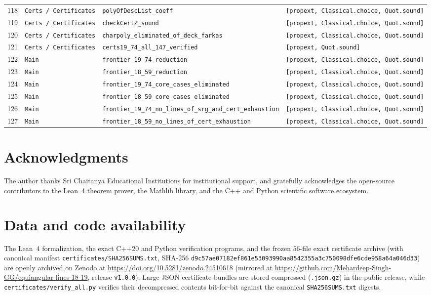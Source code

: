 \documentclass[11pt,reqno]{amsart}
\theoremstyle{definition}
\theoremstyle{remark}
\numberwithin{equation}{section}
\numberwithin{table}{section}
\begin{document}
{\begin{longtable}{@{}r>{\raggedright\arraybackslash}p{1.2in}>{\raggedright\arraybackslash}p{2.55in}>{\raggedright\arraybackslash}p{1.85in}@{}}
118 & \nolinkurl{Certs / Certificates} & \nolinkurl{polyOfDescList_coeff} & \texttt{[propext, Classical.choice, Quot.sound]} \\
119 & \nolinkurl{Certs / Certificates} & \nolinkurl{checkCertZ_sound} & \texttt{[propext, Classical.choice, Quot.sound]} \\
120 & \nolinkurl{Certs / Certificates} & \nolinkurl{charpoly_eliminated_of_deck_farkas} & \texttt{[propext, Classical.choice, Quot.sound]} \\
121 & \nolinkurl{Certs / Certificates} & \nolinkurl{certs19_74_all_147_verified} & \texttt{[propext, Quot.sound]} \\
122 & \nolinkurl{Main} & \nolinkurl{frontier_19_74_reduction} & \texttt{[propext, Classical.choice, Quot.sound]} \\
123 & \nolinkurl{Main} & \nolinkurl{frontier_18_59_reduction} & \texttt{[propext, Classical.choice, Quot.sound]} \\
124 & \nolinkurl{Main} & \nolinkurl{frontier_19_74_core_cases_eliminated} & \texttt{[propext, Classical.choice, Quot.sound]} \\
125 & \nolinkurl{Main} & \nolinkurl{frontier_18_59_core_cases_eliminated} & \texttt{[propext, Classical.choice, Quot.sound]} \\
126 & \nolinkurl{Main} & \nolinkurl{frontier_19_74_no_lines_of_srg_and_cert_exhaustion} & \texttt{[propext, Classical.choice, Quot.sound]} \\
127 & \nolinkurl{Main} & \nolinkurl{frontier_18_59_no_lines_of_cert_exhaustion} & \texttt{[propext, Classical.choice, Quot.sound]} \\
\end{longtable}
}

\section*{Acknowledgments}
The author thanks Sri Chaitanya Educational Institutions for institutional support, and gratefully acknowledges the open-source contributors to the Lean~4 theorem prover, the Mathlib library, and the C++ and Python scientific software ecosystem.

\section*{Data and code availability}
The Lean~4 formalization, the exact C++20 and Python verification programs, and the frozen $56$-file exact certificate archive (with canonical manifest \nolinkurl{certificates/SHA256SUMS.txt}, SHA-256 \nolinkurl{d9c57ae07182ef861e53093990aa8542355a3c750098dfe6cde958a64a046d33}) are openly archived on Zenodo at \url{https://doi.org/10.5281/zenodo.24510618} (mirrored at \url{https://github.com/Mehardeep-Singh-GG/equiangular-lines-18-19}, release \texttt{v1.0.0}). Large JSON certificate bundles are stored compressed (\texttt{.json.gz}) in the public release, while \nolinkurl{certificates/verify_all.py} verifies their decompressed contents bit-for-bit against the canonical \nolinkurl{SHA256SUMS.txt} digests.



\end{document}
